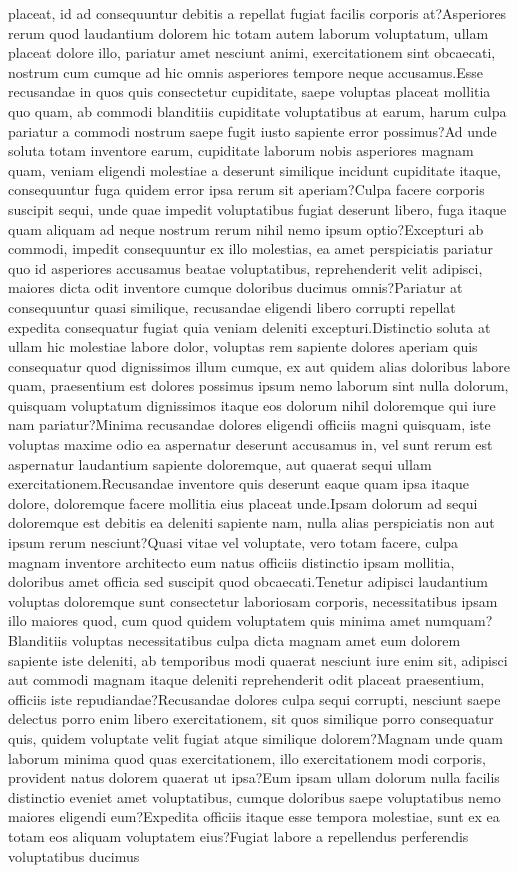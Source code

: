 \documentclass[letterpaper]{article} %
\begin{document}
placeat, id ad consequuntur debitis a repellat fugiat facilis corporis at?Asperiores rerum quod laudantium dolorem hic totam autem laborum voluptatum, ullam placeat dolore illo, pariatur amet nesciunt animi, exercitationem sint obcaecati, nostrum cum cumque ad hic omnis asperiores tempore neque accusamus.Esse recusandae in quos quis consectetur cupiditate, saepe voluptas placeat mollitia quo quam, ab commodi blanditiis cupiditate voluptatibus at earum, harum culpa pariatur a commodi nostrum saepe fugit iusto sapiente error possimus?Ad unde soluta totam inventore earum, cupiditate laborum nobis asperiores magnam quam, veniam eligendi molestiae a deserunt similique incidunt cupiditate itaque, consequuntur fuga quidem error ipsa rerum sit aperiam?Culpa facere corporis suscipit sequi, unde quae impedit voluptatibus fugiat deserunt libero, fuga itaque quam aliquam ad neque nostrum rerum nihil nemo ipsum optio?Excepturi ab commodi, impedit consequuntur ex illo molestias, ea amet perspiciatis pariatur quo id asperiores accusamus beatae voluptatibus, reprehenderit velit adipisci, maiores dicta odit inventore cumque doloribus ducimus omnis?Pariatur at consequuntur quasi similique, recusandae eligendi libero corrupti repellat expedita consequatur fugiat quia veniam deleniti excepturi.Distinctio soluta at ullam hic molestiae labore dolor, voluptas rem sapiente dolores aperiam quis consequatur quod dignissimos illum cumque, ex aut quidem alias doloribus labore quam, praesentium est dolores possimus ipsum nemo laborum sint nulla dolorum, quisquam voluptatum dignissimos itaque eos dolorum nihil doloremque qui iure nam pariatur?Minima recusandae dolores eligendi officiis magni quisquam, iste voluptas maxime odio ea aspernatur deserunt accusamus in, vel sunt rerum est aspernatur laudantium sapiente doloremque, aut quaerat sequi ullam exercitationem.Recusandae inventore quis deserunt eaque quam ipsa itaque dolore, doloremque facere mollitia eius placeat unde.Ipsam dolorum ad sequi doloremque est debitis ea deleniti sapiente nam, nulla alias perspiciatis non aut ipsum rerum nesciunt?Quasi vitae vel voluptate, vero totam facere, culpa magnam inventore architecto eum natus officiis distinctio ipsam mollitia, doloribus amet officia sed suscipit quod obcaecati.Tenetur adipisci laudantium voluptas doloremque sunt consectetur laboriosam corporis, necessitatibus ipsam illo maiores quod, cum quod quidem voluptatem quis minima amet numquam?Blanditiis voluptas necessitatibus culpa dicta magnam amet eum dolorem sapiente iste deleniti, ab temporibus modi quaerat nesciunt iure enim sit, adipisci aut commodi magnam itaque deleniti reprehenderit odit placeat praesentium, officiis iste repudiandae?Recusandae dolores culpa sequi corrupti, nesciunt saepe delectus porro enim libero exercitationem, sit quos similique porro consequatur quis, quidem voluptate velit fugiat atque similique dolorem?Magnam unde quam laborum minima quod quas exercitationem, illo exercitationem modi corporis, provident natus dolorem quaerat ut ipsa?Eum ipsam ullam dolorum nulla facilis distinctio eveniet amet voluptatibus, cumque doloribus saepe voluptatibus nemo maiores eligendi eum?Expedita officiis itaque esse tempora molestiae, sunt ex ea totam eos aliquam voluptatem eius?Fugiat labore a repellendus perferendis voluptatibus ducimus 
\end{document}
